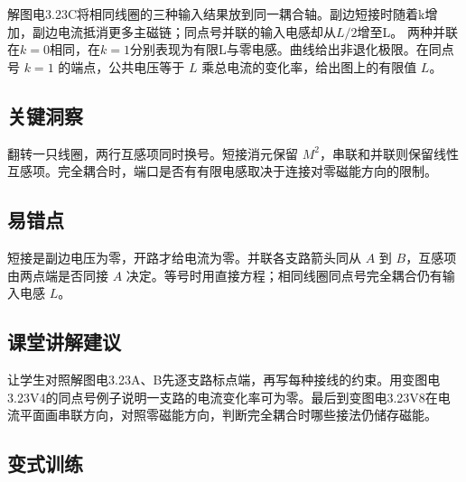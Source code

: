 \documentclass[UTF8,fontset=fandol,a4paper,11pt]{ctexart}
\begin{document}
解图电3.23C将相同线圈的三种输入结果放到同一耦合轴。副边短接时随着k增加，副边电流抵消更多主磁链；同点号并联的输入电感却从$L/2$增至L。
两种并联在$k=0$相同，在$k=1$分别表现为有限L与零电感。曲线给出非退化极限。在同点号 $k=1$ 的端点，公共电压等于 $L$ 乘总电流的变化率，给出图上的有限值 $L$。




\subsection*{关键洞察}

翻转一只线圈，两行互感项同时换号。短接消元保留 $M^2$，串联和并联则保留线性互感项。完全耦合时，端口是否有有限电感取决于连接对零磁能方向的限制。



\subsection*{易错点}

短接是副边电压为零，开路才给电流为零。并联各支路箭头同从 $A$ 到 $B$，互感项由两点端是否同接 $A$ 决定。等号时用直接方程；相同线圈同点号完全耦合仍有输入电感 $L$。



\subsection*{课堂讲解建议}

让学生对照解图电3.23A、B先逐支路标点端，再写每种接线的约束。用变图电3.23V4的同点号例子说明一支路的电流变化率可为零。最后到变图电3.23V8在电流平面画串联方向，对照零磁能方向，判断完全耦合时哪些接法仍储存磁能。


\subsection*{变式训练}
\end{document}
